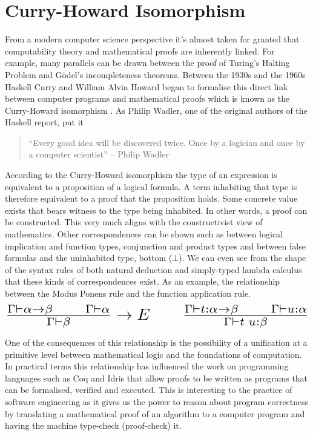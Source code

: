 \documentclass[a4paper, notitlepage]{report}
\begin{document}
\section{Curry-Howard Isomorphism}
\label{sec:org55204bf}
From a modern computer science perspective it's almost taken for granted that
computability theory and mathematical proofs are inherently linked. For example,
many parallels can be drawn between the proof of Turing's Halting Problem and
Gödel's incompleteness theorems. Between the 1930s and the 1960s Haskell Curry
and William Alvin Howard began to formalise this direct link between computer
programs and mathematical proofs which is known as the Curry-Howard isomorphism
\cite{mcadams_tutor_2013}. As Philip Wadler, one of the original authors of the
Haskell report, put it \cite{strange_loop_2015,wadler_propos_2015}

\begin{quote}
``Every good idea will be discovered twice. Once by a logician and once by a
computer scientist'' -- Philip Wadler
\end{quote}

According to the Curry-Howard isomorphism the type of an expression is
equivalent to a proposition of a logical formula. A term inhabiting that type is
therefore equivalent to a proof that the proposition holds. Some concrete value
exists that bears witness to the type being inhabited. In other words, a proof
can be constructed. This very much aligns with the constructivist view of
mathematics. Other correspondences can be shown such as between logical
implication and function types, conjunction and product types and between false
formulas and the uninhabited type, bottom (\(\bot\)). We can even see from the
shape of the syntax rules of both natural deduction and simply-typed lambda
calculus that these kinds of correspondences exist. As an example, the
relationship between the Modus Ponens rule and the function application rule.
\[ \scalebox{2}{$\frac{\Gamma \vdash \alpha \rightarrow \beta \qquad \Gamma
\vdash \alpha}{\Gamma \vdash \beta} \rightarrow E \qquad \frac{\Gamma \vdash
t:\alpha \rightarrow \beta \qquad \Gamma \vdash u:\alpha}{\Gamma \vdash
t\;u:\beta}$} \]

One of the consequences of this relationship is the possibility of a unification
at a primitive level between mathematical logic and the foundations of
computation. In practical terms this relationship has influenced the work on
programming languages such as Coq and Idris that allow proofs to be written as
programs that can be formalised, verified and executed. This is interesting to
the practice of software engineering as it gives us the power to reason about
program correctness by translating a mathematical proof of an algorithm to a
computer program and having the machine type-check (proof-check) it.
\end{document}
